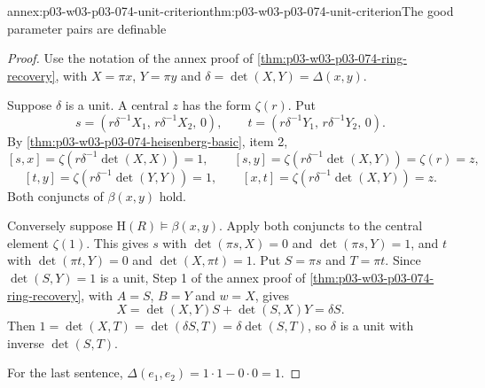 \begin{annexitem}{annex:p03-w03-p03-074-unit-criterion}{thm:p03-w03-p03-074-unit-criterion}{The good parameter pairs are definable}
\begin{proof}
Use the notation of the annex proof of
\cref{thm:p03-w03-p03-074-ring-recovery}, with \(X=\pi x\), \(Y=\pi y\)
and \(\delta=\det(X,Y)=\Delta(x,y)\).

Suppose \(\delta\) is a unit. A central \(z\) has the form \(\zeta(r)\).
Put
\[
 s=(r\delta^{-1}X_1,\,r\delta^{-1}X_2,\,0),\qquad
 t=(r\delta^{-1}Y_1,\,r\delta^{-1}Y_2,\,0).
\]
By \cref{thm:p03-w03-p03-074-heisenberg-basic}, item 2,
\[
 [s,x]=\zeta(r\delta^{-1}\det(X,X))=1,\qquad
 [s,y]=\zeta(r\delta^{-1}\det(X,Y))=\zeta(r)=z,
\]
\[
 [t,y]=\zeta(r\delta^{-1}\det(Y,Y))=1,\qquad
 [x,t]=\zeta(r\delta^{-1}\det(X,Y))=z.
\]
Both conjuncts of \(\beta(x,y)\) hold.

Conversely suppose \(\mathrm H(R)\models\beta(x,y)\). Apply both
conjuncts to the central element \(\zeta(1)\). This gives \(s\) with
\(\det(\pi s,X)=0\) and \(\det(\pi s,Y)=1\), and \(t\) with
\(\det(\pi t,Y)=0\) and \(\det(X,\pi t)=1\). Put \(S=\pi s\) and
\(T=\pi t\). Since \(\det(S,Y)=1\) is a unit, Step 1 of the annex proof
of \cref{thm:p03-w03-p03-074-ring-recovery}, with \(A=S\), \(B=Y\) and
\(w=X\), gives
\[
 X=\det(X,Y)S+\det(S,X)Y=\delta S .
\]
Then \(1=\det(X,T)=\det(\delta S,T)=\delta\det(S,T)\), so \(\delta\) is a
unit with inverse \(\det(S,T)\).

For the last sentence, \(\Delta(e_1,e_2)=1\cdot1-0\cdot0=1\).
\end{proof}
\end{annexitem}

